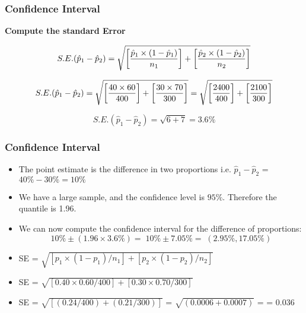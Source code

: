 
\begin{frame}
\frametitle{Confidence Interval}
\textbf{Compute the standard Error}

\[ S.E. (\hat{p}_1 - \hat{p}_2) =
\sqrt{ \left[{\hat{p}_1 \times (1 - \hat{p}_1) \over n_1}\right] + \left[{\hat{p}_2 \times (1 - \hat{p}_2) \over n_2}\right] } \]

\[ S.E. (\hat{p}_1 - \hat{p}_2) =
\sqrt{ \left[{40 \times 60 \over 400}\right] + \left[{30 \times 70 \over 300}\right] }  = \sqrt{ \left[{2400 \over 400}\right] + \left[{2100\over 300}\right] } \]

\[ S.E. (\hat{p}_1 - \hat{p}_2)
= \sqrt{ 6 + 7 } = 3.6\% \]

\end{frame}


\begin{frame}
\frametitle{Confidence Interval}
\begin{itemize}
\item The point estimate is the difference in two proportions i.e. $\hat{p}_1 - \hat{p}_2$ = $40 \% - 30 \% = 10 \%$
\item We have a large sample, and the confidence level is $95\%$. Therefore the quantile is 1.96.
\item We can now compute the confidence interval for the difference of proportions:
\[ 10\% \pm (1.96 \times 3.6 \%)  =\; 10\% \pm 7.05 \% = \;(2.95\%, 17.05\%) \]

\end{itemize}
\end{frame}

















\begin{frame}
\begin{itemize}
\item SE = $\sqrt{ [p_1 \times (1 - p_1) / n_1] + [p_2 \times (1 - p_2) / n_2] } $
\item SE = $\sqrt{ [0.40 \times 0.60 / 400] + [0.30 \times 0.70 / 300] } $
\item SE  = $\sqrt{[ (0.24 / 400) + (0.21 / 300) ]}$ = $\sqrt{(0.0006 + 0.0007)}$ =  = 0.036
\end{itemize}
\end{frame}


